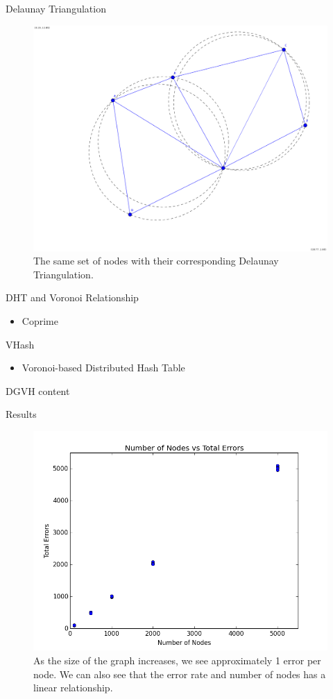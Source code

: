 \documentclass[11pt]{beamer}
\begin{document}

\begin{frame}{Delaunay Triangulation}
	\begin{figure}
		\centering
		\includegraphics[width=0.5\linewidth]{figs/delaunay}
		\caption{The same set of nodes with their corresponding Delaunay Triangulation.}
		\label{fig:delaunay}
	\end{figure}
\end{frame}


\begin{frame}{DHT and Voronoi Relationship }
	\begin{itemize}
		\item Coprime
	\end{itemize}
\end{frame}

\begin{frame}{VHash}
	\begin{itemize}
		\item Voronoi-based Distributed Hash Table
	\end{itemize}
\end{frame}


\begin{frame}{DGVH}
	content
\end{frame}






\begin{frame}{Results}
	\begin{figure}
		\centering
		\includegraphics[width=0.5\linewidth]{figs/error_rate}
		\caption{As the size of the graph increases, we see approximately 1 error per node.
		We can also see that the error rate and number of nodes has a linear relationship.}
		\label{exp_0}
	\end{figure}
\end{frame}
\end{document}
